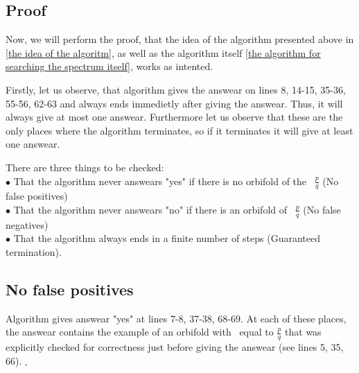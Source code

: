 \subsection{Proof}
Now, we will perform the proof, that the idea of the algorithm presented above in 
\ref{the idea of the algoritm}, as 
well as the algorithm itself \ref{the algorithm for searching the spectrum itself}, 
works as intented.

Firstly, let us observe, that algorithm gives the answear on lines 8, 14-15, 35-36, 55-56, 
62-63 and 
always ends immedietly after giving the answear. Thus, it will always give at most one answear.
Furthermore let us observe that these are the only places where the algorithm terminates, 
so if it terminates it will give at least one answear.
 
There are three things to be checked: \\
$\bullet$ That the algorithm never answears "yes" if there is no orbifold of the \Eoc\ 
$\frac{p}{q}$ (No false positives)\\
$\bullet$ That the algorithm never answears "no" if there is an orbifold of \Eoc\ 
$\frac{p}{q}$ (No false negatives)\\ 
$\bullet$ That the algorithm always ends in a finite number of steps (Guaranteed termination). 








\subsection{No false positives}
Algorithm gives answear "yes" at lines 7-8, 37-38, 68-69. At each of these places, 
the answear contains the example of an orbifold with \Eoc\ equal to $\frac{p}{q}$ that was 
explicitly checked for correctness just before giving the answear (see lines 5, 35, 66). 
$_\square$    
